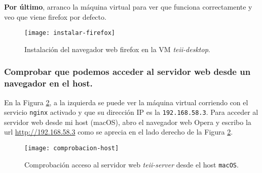 \par \textbf{Por último}, arranco la máquina virtual para ver que funciona correctamente y veo que viene firefox por defecto.
 \begin{figure}[H]
    \texttt{[image: instalar-firefox]}
    \centering
    \caption{Instalación del navegador web firefox en la VM \textit{teii-desktop}.}
    \label{fig:instalar-firefox}
\end{figure}

\subsubsection{Comprobar que podemos acceder al servidor web desde un navegador en el host.}
\par En la Figura \ref{fig:comprobacion-host}, a la izquierda se puede ver la máquina virtual 
corriendo con el servicio \texttt{nginx} activado y que su dirección IP es la \texttt{192.168.58.3}.
Para acceder al servidor web desde mi host (macOS), abro el navegador web Opera y escribo la url \url{http://192.168.58.3}
como se aprecia en el lado derecho de la Figura \ref{fig:comprobacion-host}.

 \begin{figure}[H]
    \texttt{[image: comprobacion-host]}
    \centering
    \caption{Comprobación acceso al servidor web \textit{teii-server} desde el host \texttt{macOS}.}
    \label{fig:comprobacion-host}
\end{figure}


